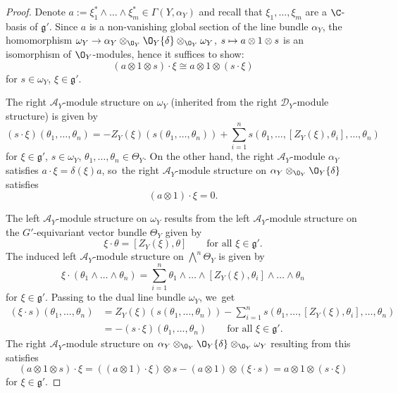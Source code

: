 \documentclass[JEP,XML,SOM,Unicode,published]{cedram}
\newcommand\mto{\mathchoice{\longmapsto}{\mapsto}{\mapsto}{\mapsto}}
\newcommand{\cA}{\mathscr{A}}
\newcommand{\frg}{\mathfrak{g}}
\begin{document}
\begin{proof}
Denote $a := \xi_1^* \wedge \dots \wedge \xi_m^* \in \Gamma(Y,\alpha_Y)$ and recall that $\xi_1,\dots,\xi_m$ are a $\C$-basis of $\frg'$. Since $a$ is a non-vanishing global section of the line bundle $\alpha_Y$, the homomorphism $\omega_Y \to \alpha_Y \otimes_{\O_Y} \O_Y\{\delta\} \otimes_{\O_Y} \omega_Y$, $s \mto a \otimes 1 \otimes s$ is an isomorphism of $\O_Y$\nobreakdash-mod\-ules, hence it suffices to show:
\[
(a \otimes 1 \otimes s) \cdot \xi \cong a \otimes 1 \otimes (s \cdot \xi)
\]
for $s \in \omega_Y$, $\xi \in \frg'$.

The right $\cA_Y$\nobreakdash-mod\-ule structure on $\omega_Y$ (inherited from the right $\mathscr{D}_Y$\nobreakdash-mod\-ule structure) is given by
\[
(s \cdot \xi)(\theta_1,\dots,\theta_n) = -Z_Y(\xi)(s(\theta_1,\dots,\theta_n))+\sum_{i=1}^n s(\theta_1,\dots,[Z_Y(\xi),\theta_i],\dots,\theta_n)
\]
for $\xi \in \frg'$, $s \in \omega_Y$, $\theta_1,\dots, \theta_n \in \Theta_Y$. On the other hand, the right $\cA_Y$\nobreakdash-mod\-ule $\alpha_Y$ satisfies $a \cdot \xi = \delta(\xi) a$, so~the right $\cA_Y$\nobreakdash-mod\-ule structure on $\alpha_Y \otimes_{\O_Y} \O_Y\{\delta\}$ satisfies
\[
(a \otimes 1) \cdot \xi = 0.
\]

The left $\cA_Y$\nobreakdash-mod\-ule structure on $\omega_Y$ results from the left $\cA_Y$\nobreakdash-mod\-ule structure on the $G'$-equivariant vector bundle $\Theta_Y$ given by
\[
\xi \cdot \theta = [Z_Y(\xi),\theta] \qquad \text{for all } \xi \in \frg'.
\]
The induced left $\cA_Y$\nobreakdash-mod\-ule structure on $\bigwedge^n \Theta_Y$ is given by
\[
\xi \cdot (\theta_1 \wedge \dots \wedge \theta_n) = \sum_{i=1}^n \theta_1 \wedge \dots \wedge [Z_Y(\xi),\theta_i] \wedge \dots \wedge \theta_n
\]
for $\xi \in \frg'$. Passing to the dual line bundle $\omega_Y$, we~get
\begin{align*}(\xi \cdot s)(\theta_1,\dots,\theta_n) &= Z_Y(\xi)(s(\theta_1,\dots,\theta_n))-\sum_{i=1}^n s(\theta_1,\dots,[Z_Y(\xi),\theta_i],\dots,\theta_n) \\
&= -(s \cdot \xi)(\theta_1,\dots,\theta_n) \qquad \text{for all }\xi \in \frg'.
\end{align*}
The right $\cA_Y$\nobreakdash-mod\-ule structure on $\alpha_Y \otimes_{\O_Y} \O_Y\{\delta\} \otimes_{\O_Y} \omega_Y$ resulting from this satisfies
\[
(a \otimes 1 \otimes s) \cdot \xi
= ((a \otimes 1) \cdot \xi) \otimes s - (a \otimes 1) \otimes (\xi \cdot s) = a \otimes 1 \otimes (s \cdot \xi)
\]
for $\xi \in \frg'$.
\end{proof}
\end{document}
